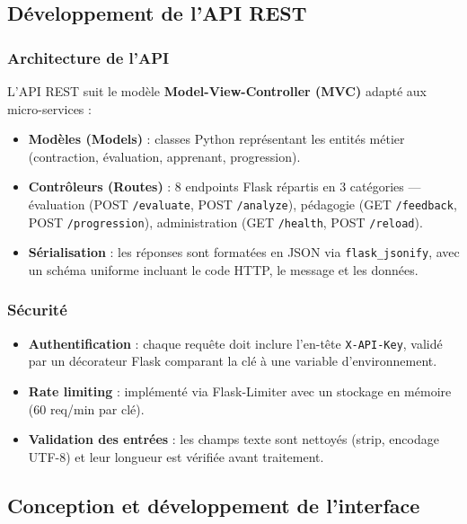 \subsection{Développement de l'API REST}

\subsubsection{Architecture de l'API}

L'API REST suit le modèle \textbf{Model-View-Controller (MVC)} adapté aux micro-services :

\begin{itemize}
    \item \textbf{Modèles (Models)} : classes Python représentant les entités métier (contraction, évaluation, apprenant, progression).
    \item \textbf{Contrôleurs (Routes)} : 8 endpoints Flask répartis en 3 catégories — évaluation (POST \texttt{/evaluate}, POST \texttt{/analyze}), pédagogie (GET \texttt{/feedback}, POST \texttt{/progression}), administration (GET \texttt{/health}, POST \texttt{/reload}).
    \item \textbf{Sérialisation} : les réponses sont formatées en JSON via \texttt{flask\_jsonify}, avec un schéma uniforme incluant le code HTTP, le message et les données.
\end{itemize}

\subsubsection{Sécurité}

\begin{itemize}
    \item \textbf{Authentification} : chaque requête doit inclure l'en-tête \texttt{X-API-Key}, validé par un décorateur Flask comparant la clé à une variable d'environnement.
    \item \textbf{Rate limiting} : implémenté via Flask-Limiter avec un stockage en mémoire (60 req/min par clé).
    \item \textbf{Validation des entrées} : les champs texte sont nettoyés (strip, encodage UTF-8) et leur longueur est vérifiée avant traitement.
\end{itemize}

\subsection{Conception et développement de l'interface}

